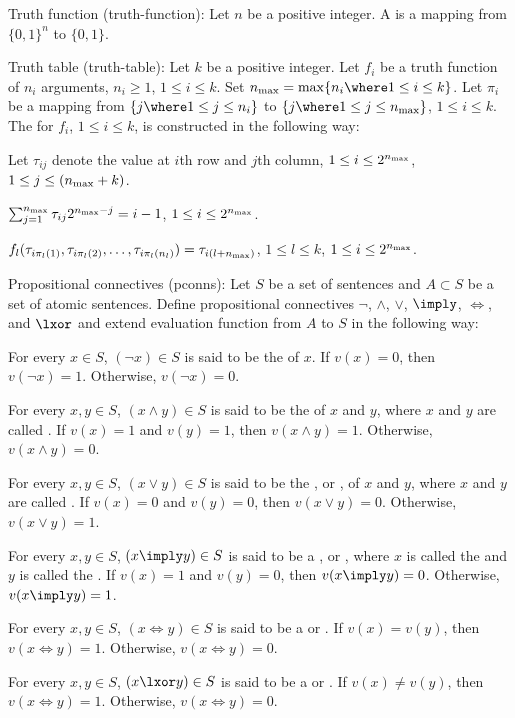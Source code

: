  Truth function (truth-function):
  Let $n$ be a positive integer. A  is a mapping from
  $\{0, 1\}^n$ to $\{0, 1\}$.
\quit

 Truth table (truth-table):
  Let $k$ be a positive integer. Let $f_i$ be a truth function of $n_i$
  arguments, $n_i \ge 1$, $1 \le i \le k$. Set $n_{\rm max} = \max\{n_i \where
  1 \le i \le k\}$. Let $\pi_i$ be a mapping from $\{j \where 1 \le j \le n_i
  \}$ to $\{j \where 1 \le j \le n_{\rm max}\}$, $1 \le i \le k$. The
   for $f_i$, $1 \le i \le k$, is constructed in the
  following way:
    \item Let $\tau_{ij}$ denote the value at $i$th row and $j$th column, $1
      \le i \le 2^{n_{\rm max}}$, $1 \le j \le (n_{\rm max} + k)$.
    \item $\sum_{j = 1}^{n_{\rm max}} \tau_{ij} 2^{n_{\rm max} - j} = i - 1$,
      $1 \le i \le 2^{n_{\rm max}}$.
    \item $f_l(\tau_{i\pi_l(1)}, \tau_{i\pi_l(2)}, \ldots, \tau_{i\pi_l(n_l)})
      = \tau_{i(l + n_{\rm max})}$, $1 \le l \le k$, $1 \le i \le 2^{n_{\rm
      max}}$.
  \quit
\quit

 Propositional connectives (pconns):
  Let $S$ be a set of sentences and $A \subset S$ be a set of atomic sentences.
  Define propositional connectives $\lnot$, $\land$, $\lor$, $\imply$, $\iff$,
  and $\lxor$ and extend evaluation function from $A$ to $S$ in the following
  way:
  \list
    \item For every $x \in S$, $(\lnot x) \in S$ is said to be the
       of $x$. If $v(x) = 0$, then $v(\lnot x) = 1$. Otherwise,
      $v(\lnot x) = 0$.
    \item For every $x, y \in S$, $(x\land y) \in S$ is said to be the
       of $x$ and $y$, where $x$ and $y$ are called
      . If $v(x) = 1$ and $v(y) = 1$, then $v(x\land y) = 1$.
      Otherwise, $v(x\land y) = 0$.
    \item For every $x, y \in S$, $(x\lor y) \in S$ is said to be the
      , or , of $x$ and $y$, where $x$ and
      $y$ are called . If $v(x) = 0$ and $v(y) = 0$, then $v(x
      \lor y) = 0$. Otherwise, $v(x\lor y) = 1$.
    \item For every $x, y \in S$, $(x\imply y) \in S$ is said to be a
      , or , where $x$ is called the
       and $y$ is called the . If $v(x) = 1$
      and $v(y) = 0$, then $v(x\imply y) = 0$. Otherwise, $v(x\imply y) = 1$.
    \item For every $x, y \in S$, $(x\iff y) \in S$ is said to be a
       or . If $v(x) = v(y)$,
      then $v(x\iff y) = 1$. Otherwise, $v(x\iff y) = 0$.
    \item For every $x, y \in S$, $(x\lxor y) \in S$ is said to be a
       or . If $v(x) \neq v(y)
      $, then $v(x\iff y) = 1$. Otherwise, $v(x\iff y) = 0$.
  \quit
\quit

